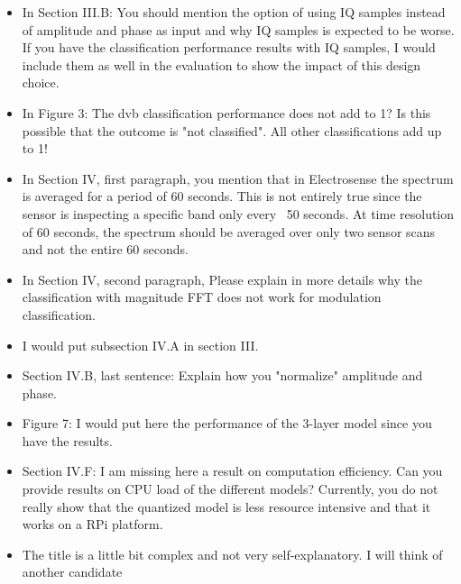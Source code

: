 {\begin{itemize}
\item In Section III.B: You should mention the option of using IQ samples instead of amplitude and phase as input and why IQ samples is expected to be worse. If you have the classification performance results with IQ samples, I would include them as well in the evaluation to show the impact of this design choice.
\item In Figure 3: The dvb classification performance does not add to 1? Is this possible that the outcome is "not classified". All other classifications add up to 1!
\item In Section IV, first paragraph, you mention that in Electrosense the spectrum is averaged for a period of 60 seconds. This is not entirely true since the sensor is inspecting a specific band only every ~50 seconds. At time resolution of 60 seconds, the spectrum should be averaged over only two sensor scans and not the entire 60 seconds.
\item In Section IV, second paragraph, Please explain in more details why the classification with magnitude FFT does not work for modulation classification.
\item I would put subsection IV.A in section III.
\item Section IV.B, last sentence: Explain how you "normalize" amplitude and phase.
\item Figure 7: I would put here the performance of the 3-layer model since you have the results.
\item Section IV.F: I am missing here a result on computation efficiency. Can you provide results on CPU load of the different models? Currently, you do not really show that the quantized model is less resource intensive and that it works on a RPi platform.
\item The title is a little bit complex and not very self-explanatory. I will think of another candidate
\end{itemize}
}
